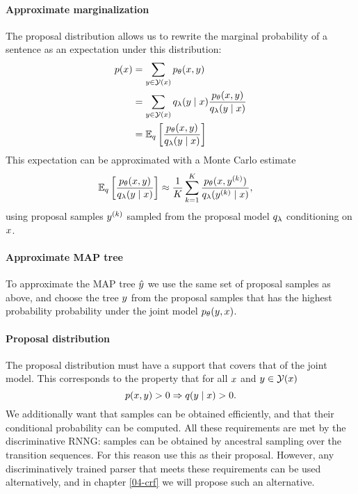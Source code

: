     \paragraph{Approximate marginalization}
    The proposal distribution allows us to rewrite the marginal probability of a sentence as an expectation under this distribution:
    \begin{align*}
      p (x)
        &= \sum_{y  \in \mathcal{Y}(x)} p_{\theta}(x, y) \\
        &= \sum_{y  \in \mathcal{Y}(x)} q_{\lambda}(y \mid x) \frac{p_{\theta}(x,y )}{q_{\lambda}(y \mid x)} \\
        &= \operatorname{\mathbb{E}}_{q} \bigg[\frac{p_{\theta}(x,y )}{q_{\lambda}(y \mid  x)} \bigg] \\
    \end{align*}
    This expectation can be approximated with a Monte Carlo estimate
    \begin{align}
      \operatorname{\mathbb{E}}_{q} \bigg[\frac{p_{\theta}(x, y)}{q_{\lambda}(y \mid x)} \bigg]
        &\approx \frac{1}{K}\sum_{k=1}^K  \frac{p_{\theta}( x, y^{(k)} )}{q_{\lambda}(y^{(k)} \mid x)},
    \end{align}
    using proposal samples $y^{(k)}$ sampled from the proposal model $q_{\lambda}$ conditioning on $x$.

    \paragraph{Approximate MAP tree}
    To approximate the MAP tree $\hat{y}$ we use the same set of proposal samples as above, and choose the tree $y$ from the proposal samples that has the highest probability probability under the joint model $p_{\theta}( y, x)$.

    \paragraph{Proposal distribution}
    The proposal distribution must have a support that covers that of the joint model. This corresponds to the property that for all $x$ and $y \in \mathcal{Y}(x)$
    \begin{equation*}
      p(x, y) > 0 \Rightarrow q( y \mid x ) > 0.
    \end{equation*}
    We additionally want that samples can be obtained efficiently, and that their conditional probability can be computed. All these requirements are met by the discriminative RNNG: samples can be obtained by ancestral sampling over the transition sequences. For this reason \citet{dyer2016rnng} use this as their proposal. However, any discriminatively trained parser that meets these requirements can be used alternatively, and in chapter \ref{04-crf} we will propose such an alternative.

